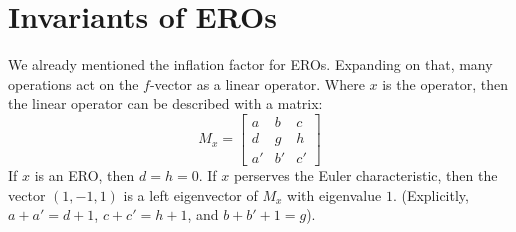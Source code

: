 \documentclass[12pt]{amsart}%
\begin{document}
%
%

\section{Invariants of EROs}
We already mentioned the inflation factor for EROs. \cite{brinkmann}
Expanding on that, many operations act on the $f$-vector as a linear operator.
Where $x$ is the operator, then the linear operator can be described with a
matrix:
\begin{equation}
  M_x = \begin{bmatrix}
  a & b & c \\
  d & g & h \\
  a' & b' & c' \end{bmatrix}
\end{equation}
If $x$ is an ERO, then $d = h= 0$. If $x$ perserves the Euler characteristic,
then the vector $(1,-1,1)$ is a left eigenvector of $M_x$ with eigenvalue $1$.
(Explicitly, $a + a' = d + 1$, $c+ c' = h+1$, and $b + b' + 1 = g$).
\end{document}
